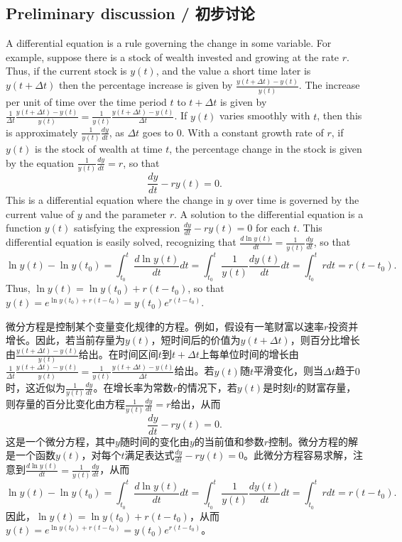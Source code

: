\subsection{Preliminary discussion / 初步讨论}

\begin{original}
A differential equation is a rule governing the change in some variable. For example, suppose there is a stock of wealth invested and growing at the rate $r$. Thus, if the current stock is $y(t)$, and the value a short time later is $y(t + \Delta t)$ then the percentage increase is given by $\frac{y(t+\Delta t) - y(t)}{y(t)}$. The increase per unit of time over the time period $t$ to $t + \Delta t$ is given by $\frac{1}{\Delta t}\frac{y(t+\Delta t) - y(t)}{y(t)} = \frac{1}{y(t)}\frac{y(t+\Delta t) - y(t)}{\Delta t}$. If $y(t)$ varies smoothly with $t$, then this is approximately $\frac{1}{y(t)}\frac{dy}{dt}$, as $\Delta t$ goes to $0$. With a constant growth rate of $r$, if $y(t)$ is the stock of wealth at time $t$, the percentage change in the stock is given by the equation $\frac{1}{y(t)}\frac{dy}{dt} = r$, so that
\[
\frac{dy}{dt} - r y(t) = 0.
\]
This is a differential equation where the change in $y$ over time is governed by the current value of $y$ and the parameter $r$. A solution to the differential equation is a function $y(t)$ satisfying the expression $\frac{dy}{dt} - r y(t) = 0$ for each $t$. This differential equation is easily solved, recognizing that $\frac{d \ln y(t)}{dt} = \frac{1}{y(t)}\frac{dy}{dt}$, so that
\[
\ln y(t) - \ln y(t_0) = \int_{t_0}^{t} \frac{d \ln y(t)}{dt} dt = \int_{t_0}^{t} \frac{1}{y(t)}\frac{d y(t)}{dt} dt = \int_{t_0}^{t} r dt = r(t - t_0).
\]
Thus, $\ln y(t) = \ln y(t_0) + r(t - t_0)$, so that $y(t) = e^{\ln y(t_0)+r(t-t_0)} = y(t_0)e^{r(t-t_0)}$.
\end{original}
\begin{translation}
微分方程是控制某个变量变化规律的方程。例如，假设有一笔财富以速率$r$投资并增长。因此，若当前存量为$y(t)$，短时间后的价值为$y(t + \Delta t)$，则百分比增长由$\frac{y(t+\Delta t) - y(t)}{y(t)}$给出。在时间区间$t$到$t + \Delta t$上每单位时间的增长由$\frac{1}{\Delta t}\frac{y(t+\Delta t) - y(t)}{y(t)} = \frac{1}{y(t)}\frac{y(t+\Delta t) - y(t)}{\Delta t}$给出。若$y(t)$随$t$平滑变化，则当$\Delta t$趋于$0$时，这近似为$\frac{1}{y(t)}\frac{dy}{dt}$。在增长率为常数$r$的情况下，若$y(t)$是时刻$t$的财富存量，则存量的百分比变化由方程$\frac{1}{y(t)}\frac{dy}{dt} = r$给出，从而
\[
\frac{dy}{dt} - r y(t) = 0.
\]
这是一个微分方程，其中$y$随时间的变化由$y$的当前值和参数$r$控制。微分方程的解是一个函数$y(t)$，对每个$t$满足表达式$\frac{dy}{dt} - r y(t) = 0$。此微分方程容易求解，注意到$\frac{d \ln y(t)}{dt} = \frac{1}{y(t)}\frac{dy}{dt}$，从而
\[
\ln y(t) - \ln y(t_0) = \int_{t_0}^{t} \frac{d \ln y(t)}{dt} dt = \int_{t_0}^{t} \frac{1}{y(t)}\frac{d y(t)}{dt} dt = \int_{t_0}^{t} r dt = r(t - t_0).
\]
因此，$\ln y(t) = \ln y(t_0) + r(t - t_0)$，从而$y(t) = e^{\ln y(t_0)+r(t-t_0)} = y(t_0)e^{r(t-t_0)}$。
\end{translation}

